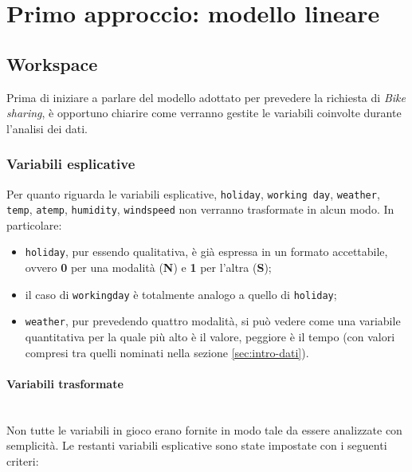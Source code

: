 \section{Primo approccio: modello lineare}

\subsection{Workspace}

Prima di iniziare a parlare del modello adottato per prevedere la richiesta di
\emph{Bike sharing}, è opportuno chiarire come verranno gestite le variabili
coinvolte durante l'analisi dei dati.

\subsubsection{Variabili esplicative}\label{sec:modlin-work-espl}
Per quanto riguarda le variabili esplicative, \texttt{holiday},
\texttt{working day}, \texttt{weather}, \texttt{temp}, \texttt{atemp},
\texttt{humidity}, \texttt{windspeed} non verranno trasformate in alcun modo.
In particolare:

\begin{itemize}
\item \texttt{holiday}, pur essendo qualitativa, è già espressa in un formato
  accettabile, ovvero \textbf{0} per una modalità (\textbf{N}) e \textbf{1}
  per l'altra (\textbf{S});
\item il caso di \texttt{workingday} è totalmente analogo a quello di
  \texttt{holiday};
\item \texttt{weather}, pur prevedendo quattro modalità, si può vedere come
  una variabile quantitativa per la quale più alto è il valore, peggiore è il
  tempo (con valori compresi tra quelli nominati nella sezione
  \ref{sec:intro-dati}).
\end{itemize}

\paragraph{Variabili trasformate} \mbox{}\\
Non tutte le variabili in gioco erano fornite in modo tale da essere
analizzate con semplicità.
Le restanti variabili esplicative sono state impostate con i seguenti criteri:

